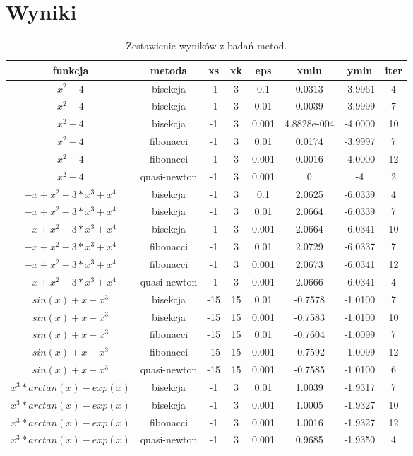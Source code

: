 \documentclass{classrep}
\begin{document}
\section{Wyniki}
	\begin{table}[H]
		\begin{center}
\begin{tabular}{|c|c|c|c|c|c|c|c|}

\hline funkcja & metoda & xs & xk & eps & xmin & ymin & iter \\
\hline $x^2 - 4$ & bisekcja & -1 & 3 & 0.1 & 0.0313 & -3.9961 & 4\\
\hline $x^2 - 4$ & bisekcja & -1 & 3 & 0.01 & 0.0039 & -3.9999 & 7\\
\hline $x^2 - 4$ & bisekcja & -1 & 3 & 0.001 & 4.8828e-004 & -4.0000 & 10 \\
\hline $x^2 - 4$ & fibonacci & -1 & 3 & 0.01 & 0.0174 & -3.9997 & 7\\
\hline $x^2 - 4$ & fibonacci & -1 & 3 & 0.001 & 0.0016 & -4.0000 & 12 \\
\hline $x^2 - 4$ & quasi-newton & -1 & 3 & 0.001 & 0 & -4 & 2\\
\hline $-x + x^2 - 3*x^3 + x^4$ & bisekcja & -1 & 3 & 0.1 & 2.0625 & -6.0339 & 4 \\
\hline $-x + x^2 - 3*x^3 + x^4$ & bisekcja & -1 & 3 & 0.01 & 2.0664 & -6.0339 & 7 \\
\hline $-x + x^2 - 3*x^3 + x^4$ & bisekcja & -1 & 3 & 0.001 & 2.0664 & -6.0341 &10 \\
\hline $-x + x^2 - 3*x^3 + x^4$ & fibonacci & -1 & 3 & 0.01 & 2.0729 & -6.0337 & 7 \\
\hline $-x + x^2 - 3*x^3 + x^4$ & fibonacci & -1 & 3 & 0.001 & 2.0673 & -6.0341 & 12 \\
\hline $-x + x^2 - 3*x^3 + x^4$ & quasi-newton & -1 & 3 & 0.001 & 2.0666 & -6.0341 & 4\\
\hline $sin(x)+x-x^3$ & bisekcja & -15 & 15 & 0.01 & -0.7578 & -1.0100 & 7\\
\hline $sin(x)+x-x^3$ & bisekcja & -15 & 15 & 0.001 & -0.7583 & -1.0100 & 10\\
\hline $sin(x)+x-x^3$ & fibonacci & -15 & 15 & 0.01 & -0.7604 & -1.0099 & 7 \\
\hline $sin(x)+x-x^3$ & fibonacci & -15 & 15 & 0.001 & -0.7592 & -1.0099 & 12\\
\hline $sin(x)+x-x^3$ & quasi-newton & -15 & 15 & 0.001 & -0.7585 & -1.0100 & 6 \\
\hline $x^3*arctan(x)-exp(x)$ & bisekcja & -1 & 3 & 0.01 & 1.0039 & -1.9317 & 7 \\
\hline $x^3*arctan(x)-exp(x)$ & bisekcja & -1 & 3 & 0.001 & 1.0005 & -1.9327 & 10\\
\hline $x^3*arctan(x)-exp(x)$ & fibonacci & -1 & 3 & 0.001 & 1.0016 & -1.9327  & 12\\
\hline $x^3*arctan(x)-exp(x)$ & quasi-newton & -1 & 3 & 0.001 & 0.9685 & -1.9350 & 4 \\
\hline
\end{tabular} 
				\caption{Zestawienie wyników z badań metod.}
		\end{center}
	\end{table}
	
\end{document}
